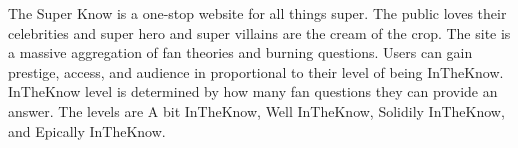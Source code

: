 \documentclass[blue]{LRSguildcamp1}
\begin{document}
\name{\bTest{}}
The Super Know is a one-stop website for all things super. The public loves their celebrities and super hero and super villains are the cream of the crop. The site is a massive aggregation of fan theories and burning questions. Users can gain prestige, access, and audience in proportional to their level of being InTheKnow. InTheKnow level is determined by how many fan questions they can provide an answer. The levels are A bit InTheKnow, Well InTheKnow, Solidily InTheKnow, and
Epically InTheKnow.
\end{document}

